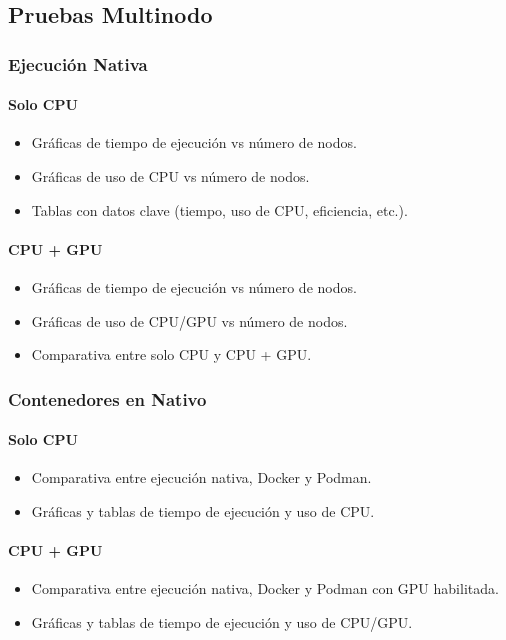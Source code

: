 \subsection{Pruebas Multinodo}
\subsubsection{Ejecución Nativa}
\paragraph{Solo CPU}
\begin{itemize}
    \item Gráficas de tiempo de ejecución vs número de nodos.
    \item Gráficas de uso de CPU vs número de nodos.
    \item Tablas con datos clave (tiempo, uso de CPU, eficiencia, etc.).
\end{itemize}
\paragraph{CPU + GPU}
\begin{itemize}
    \item Gráficas de tiempo de ejecución vs número de nodos.
    \item Gráficas de uso de CPU/GPU vs número de nodos.
    \item Comparativa entre solo CPU y CPU + GPU.
\end{itemize}
\subsubsection{Contenedores en Nativo}
\paragraph{Solo CPU}
\begin{itemize}
    \item Comparativa entre ejecución nativa, Docker y Podman.
    \item Gráficas y tablas de tiempo de ejecución y uso de CPU.
\end{itemize}
\paragraph{CPU + GPU}
\begin{itemize}
    \item Comparativa entre ejecución nativa, Docker y Podman con GPU habilitada.
    \item Gráficas y tablas de tiempo de ejecución y uso de CPU/GPU.
\end{itemize}
